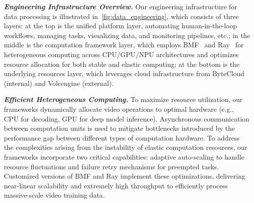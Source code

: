 \textbf{\textit{Engineering Infrastructure Overview.}}
Our engineering infrastructure for data processing is illustrated in~\cref{fig:data_engineering},  which consists of three layers: 
at the top is the unified platform layer, automating human-in-the-loop workflows, managing tasks, visualizing data, and monitoring pipelines, etc.; 
in the middle is the computation framework layer, which employs BMF~\cite{bmf} and Ray~\cite{ray} for heterogeneous computing across CPU/GPU/NPU architectures and optimizes resource allocation for both stable and elastic computing; 
at the bottom is the underlying resources layer, which leverages cloud infrastructure from ByteCloud (internal) and Volcengine (external).

\textbf{\textit{Efficient Heterogeneous Computing.}}
\label{sec:engineering_infra_computing}
To maximize resource utilization, our frameworks dynamically allocate video operations to optimal hardware (e.g., CPU for decoding, GPU for deep model inference). Asynchronous communication between computation units is used to mitigate bottlenecks introduced by the performance gap between different types of computation hardware.
%
To address the complexities arising from the instability of elastic computation resources, our frameworks incorporate two critical capabilities: adaptive auto-scaling to handle resource fluctuations and failure retry mechanisms for preempted tasks. 
%
Customized versions of BMF and Ray implement these optimizations, delivering near-linear scalability and extremely high throughput to efficiently process massive-scale video training data.